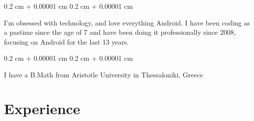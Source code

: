 \documentclass[10pt, letterpaper]{article}
\newenvironment{onecolentry}{
    \begin{adjustwidth}{
        0.2 cm + 0.00001 cm
    }{
        0.2 cm + 0.00001 cm
    }
}{
    \end{adjustwidth}
} %
\begin{document}
        \begin{onecolentry}
            I'm obsessed with technology, and love everything Android. I have been coding as a pastime since the age of 7 and have been doing it professionally since 2008, focusing on Android for the last 13 years.
        \end{onecolentry}

        \vspace{0.2 cm}

        \begin{onecolentry}
            I have a B.Math from Aristotle University in Thessaloniki, Greece
        \end{onecolentry}


    
    \section{Experience}
\end{document}
